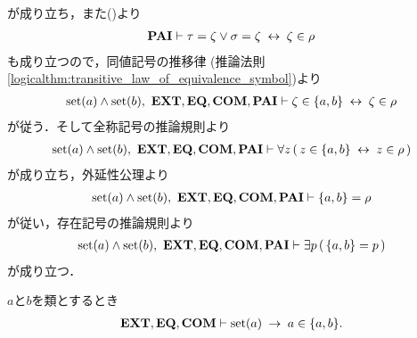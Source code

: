 \begin{sketch}
\begin{description}
				が成り立ち，また()より
				\begin{align}
					\mbox{{\bf PAI}} \vdash \tau = \zeta \vee \sigma = \zeta \hspace{0.25em}\leftrightarrow\hspace{0.25em} \zeta \in \rho
				\end{align}
				も成り立つので，同値記号の推移律
				(推論法則\ref{logicalthm:transitive_law_of_equivalence_symbol})より
				\begin{align}
					\operatorname*{set} (a) \wedge \operatorname*{set} (b),\ \mbox{{\bf EXT}},\mbox{{\bf EQ}},\mbox{\bf COM},\mbox{{\bf PAI}} \vdash 
					\zeta \in \{a,b\} \hspace{0.25em}\leftrightarrow\hspace{0.25em} \zeta \in \rho
				\end{align}
				が従う．そして全称記号の推論規則より
				\begin{align}
					\operatorname*{set} (a) \wedge \operatorname*{set} (b),\ \mbox{{\bf EXT}},\mbox{{\bf EQ}},\mbox{\bf COM},\mbox{{\bf PAI}} \vdash 
					\forall z\, (\, z \in \{a,b\} \hspace{0.25em}\leftrightarrow\hspace{0.25em} z \in \rho\, )
				\end{align}
				が成り立ち，外延性公理より
				\begin{align}
					\operatorname*{set} (a) \wedge \operatorname*{set} (b),\ \mbox{{\bf EXT}},\mbox{{\bf EQ}},\mbox{\bf COM},\mbox{{\bf PAI}} \vdash 
					\{a,b\} = \rho
				\end{align}
				が従い，存在記号の推論規則より
				\begin{align}
					\operatorname*{set} (a) \wedge \operatorname*{set} (b),\ \mbox{{\bf EXT}},\mbox{{\bf EQ}},\mbox{\bf COM},\mbox{{\bf PAI}} \vdash 
					\exists p\, (\, \{a,b\} = p\, )
				\end{align}
				が成り立つ．
				\QED
		\end{description}
	\end{sketch}
	
	\begin{screen}
		\begin{thm}[集合は対の要素たりうる]\label{thm:set_is_an_element_of_its_pair}
			$a$と$b$を類とするとき
			\begin{align}
				\mbox{{\bf EXT}},\mbox{{\bf EQ}},\mbox{\bf COM} \vdash \operatorname*{set} (a) \hspace{0.25em}\rightarrow\hspace{0.25em} a \in \{a,b\}.
			\end{align}
		\end{thm}
	\end{screen}
	
